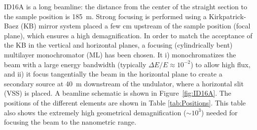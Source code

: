 \documentclass{iucr}              %
\begin{document}
\begin{table}\label{tab:Undulators}
\centering
\caption{Parameters of the undulators available at the ID16A beamline: period ($\lambda_u$), length ($L$), number of identical undulators ($N$) and deflection parameter ($K$) values for the three main photon energies in use. The valuse are shown for the two ESRF magnetic lattices: the old ESRF-1, with $E_e = 6.04$~GeV), and the new ESRF-EBS, with $E_e = 6.00$~GeV. $n$ is the emission harmonic in use for each particular photon energy.}

\end{table}

ID16A is a long beamline: the distance from the center of the straight section to the sample position is 185~m. Strong focusing is performed using a Kirkpatrick-Baez (KB) mirror system placed a few cm upstream of the sample position (focal plane), which ensures a high demagnification. In order to match the acceptance of the KB in the vertical and horizontal planes, a focusing (cylindrically bent) multilayer monochromator (ML) has
been chosen. It i) monochromatizes the beam with a large energy bandwidth (typically $\Delta E/E \approx 10^{-2}$) to allow high flux, 
and ii) it focus tangentially the beam in the horizontal plane to create a secondary source at 40~m downstream of the undulator, where a horizontal slit (VSS) is placed. A beamline schematic is shown in Figure~\ref{fig:ID16A}. The positions of the different elements are shown in Table \ref{tab:Positions}. This table also shows the extremely high geometrical demagnification ($\sim 10^3$) needed for focusing the beam to the nanometric range.  
\end{document}
